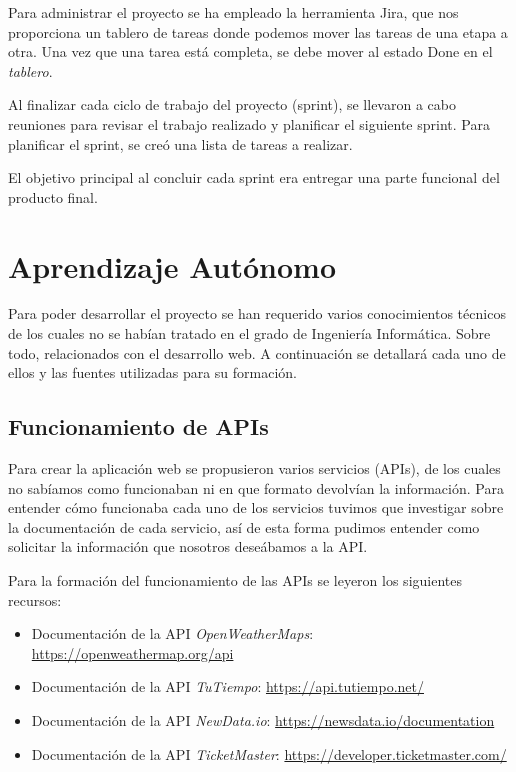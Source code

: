 Para administrar el proyecto se ha empleado la herramienta Jira, que nos proporciona un tablero de tareas donde podemos mover las tareas de una etapa a otra. Una vez que una tarea está completa, se debe mover al estado Done en el \textit{tablero}.

Al finalizar cada ciclo de trabajo del proyecto (sprint), se llevaron a cabo reuniones para revisar el trabajo realizado y planificar el siguiente sprint. Para planificar el sprint, se creó una lista de tareas a realizar. 

El objetivo principal al concluir cada sprint era entregar una parte funcional del producto final.

\section{Aprendizaje Autónomo}

Para poder desarrollar el proyecto se han requerido varios conocimientos técnicos de los cuales no se habían tratado en el grado de Ingeniería Informática. Sobre todo, relacionados con el desarrollo web. A continuación se detallará cada uno de ellos y las fuentes utilizadas para su formación.

\subsection{Funcionamiento de APIs}

Para crear la aplicación web se propusieron varios servicios (APIs), de los cuales no sabíamos como funcionaban ni en que formato devolvían la información. Para entender cómo funcionaba cada uno de los servicios tuvimos que investigar sobre la documentación de cada servicio, así de esta forma pudimos entender como solicitar la información que nosotros deseábamos a la API.

Para la formación del funcionamiento de las APIs se leyeron los siguientes recursos: 

\begin{itemize}
    \item Documentación de la API \textit{OpenWeatherMaps}: \url{https://openweathermap.org/api}
    \item Documentación de la API \textit{TuTiempo}: \url{https://api.tutiempo.net/}
    \item Documentación de la API \textit{NewData.io}: \url{https://newsdata.io/documentation}
    \item Documentación de la API \textit{TicketMaster}: \url{https://developer.ticketmaster.com/}
\end{itemize}


